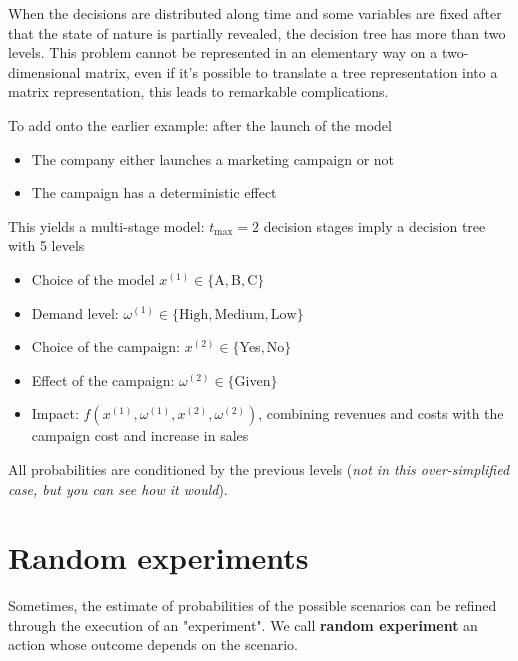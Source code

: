 When the decisions are distributed along time and some variables are fixed after that the state of nature is partially revealed, the decision tree has more than two levels. This problem cannot be represented in an elementary way on a two-dimensional matrix, even if it's possible to translate a tree representation into a matrix representation, this leads to remarkable complications.

To add onto the earlier example: after the launch of the model
\begin{itemize}
	\item The company either launches a marketing campaign or not
	
	\item The campaign has a deterministic effect
\end{itemize}
This yields a multi-stage model: $t_{\max} = 2$ decision stages imply a decision tree with 5 levels
\begin{itemize}
	\item Choice of the model $x^{(1)} \in \{$A$, $B$, $C$\}$
	
	\item Demand level: $\omega^{(1)} \in \{\text{High}, \text{Medium}, \text{Low}\}$
	
	\item Choice of the campaign: $x^{(2)} \in \{$Yes$, $No$\}$
	
	\item Effect of the campaign: $\omega^{(2)} \in \{$Given$\}$
	
	\item Impact: $f(x^{(1)}, \omega^{(1)}, x^{(2)}, \omega^{(2)})$, combining revenues and costs with the campaign cost and increase in sales
\end{itemize}
All probabilities are conditioned by the previous levels (\textit{not in this over-simplified case, but you can see how it would}).

\section{Random experiments}

Sometimes, the estimate of probabilities of the possible scenarios can be refined through the execution of an "experiment". We call \textbf{random experiment} an action whose outcome depends on the scenario.

